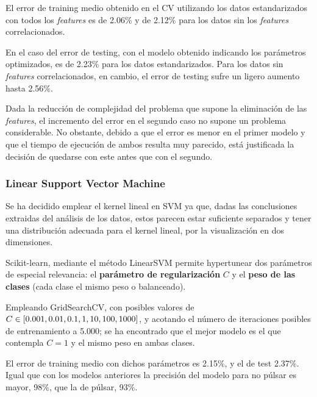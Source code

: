 \documentclass[a4paper]{article} %
\begin{document}
El error de training medio obtenido en el CV utilizando los datos estandarizados con todos los \textit{features} es de 2.06\% y de 2.12\% para los datos sin los \textit{features} correlacionados.\vspace{5mm}

En el caso del error de testing, con el modelo obtenido indicando los parámetros optimizados, es de 2.23\% para los datos estandarizados. Para los datos sin \textit{features} correlacionados, en cambio, el error de testing sufre un ligero aumento hasta 2.56\%. \vspace{5mm}

Dada la reducción de complejidad del problema que supone la eliminación de las \textit{features}, el incremento del error en el segundo caso no supone un problema considerable. No obstante, debido a que el error es menor en el primer modelo y que el tiempo de ejecución de ambos resulta muy parecido, está justificada la decisión de quedarse con este antes que con el segundo. 

\subsubsection{Linear Support Vector Machine}
Se ha decidido emplear el kernel lineal en SVM ya que, dadas las conclusiones extraidas del análisis de los datos, estos parecen estar suficiente separados y tener una distribución adecuada para el kernel lineal, por la visualización en dos dimensiones.\vspace{5mm}

Scikit-learn, mediante el método LinearSVM permite hypertunear dos parámetros de especial relevancia: el \textbf{parámetro de regularización} $C$ y el \textbf{peso de las clases} (cada clase el mismo peso o balanceado).\vspace{5mm}

Empleando GridSearchCV, con posibles valores de $C\in[0.001, 0.01, 0.1, 1, 10, 100,\\ 1000]$, y acotando el número de iteraciones posibles de entrenamiento a 5.000; se ha encontrado que el mejor modelo es el que contempla $C = 1$ y el mismo peso en ambas clases.\vspace{5mm}

El error de training medio con dichos parámetros es 2.15\%, y el de test 2.37\%. Igual que con los modelos anteriores la precisión del modelo para no púlsar es mayor, 98\%, que la de púlsar, 93\%.\vspace{5mm}
\end{document}
